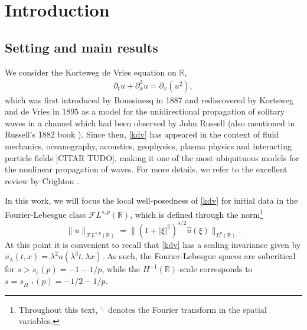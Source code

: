 \documentclass[%
11pt,  reqno]{amsart}
\newcommand{\blue}{\color{blue}}
\newcommand{\5}{\textup{V}}
\newcommand{\dx}{\partial_x}
\newcommand{\dt}{\partial_t}
\theoremstyle{remark}
\newcommand{\R}{\mathbb{R}}
\numberwithin{equation}{section}
\numberwithin{theorem}{section}
\begin{document}
		
    
	
	\section{Introduction}
	\subsection{Setting and main results}
	We consider the Korteweg de Vries equation on $\R$,
	\begin{align}
		\label{kdv}\tag{KdV}
		\dt u + \dx^3 u = \dx(u^2),
	\end{align}
	which was first introduced by Boussinesq in 1887 \cite{Boussinesq} and rediscovered by Korteweg and de Vries in 1895 \cite{KortewegDeVries} as a model for the unidirectional propagation of solitary waves in a channel which had been observed by John Russell (also mentioned in Russell's 1882 book \cite{Russell}). Since then, \eqref{kdv} has appeared in the context of fluid mechanics, oceanography, acoustics, geophysics, plasma physics and interacting particle fields [CITAR TUDO], making it one of the most ubiquituous models for the nonlinear propagation of waves. For more details, we refer to the excellent review by Crighton \cite{Crighton}.
	
	\medskip
	
	
	In this work, we will focus the local well-posedness of \eqref{kdv} for initial data in the Fourier-Lebesgue class $\mathcal{F}L^{s,p}(\R)$, which is defined through the norm\footnote{Throughout this text, $\hat{\cdot}$ denotes the Fourier transform in the spatial variables.}
	\begin{equation}
		\|u\|_{\mathcal{F}L^{s,p}(\R)}=\|(1+|\xi|^2)^{s/2}\hat{u}(\xi)\|_{L^p(\R)}.
	\end{equation}
	At this point it is convenient to recall that \eqref{kdv} has a scaling invariance given by $u_\lambda(t,x)=\lambda^{2}u(\lambda^3 t, \lambda x)$. As such, the Fourier-Lebesgue spaces are subcritical for $s>s_c(p)=-1-1/p$, while the $H^{-1}(\R)$-scale corresponds to $s=s_{H^{-1}}(p)=-1/2-1/p$. 
	
	
	
	
	\medskip
	
\end{document}
